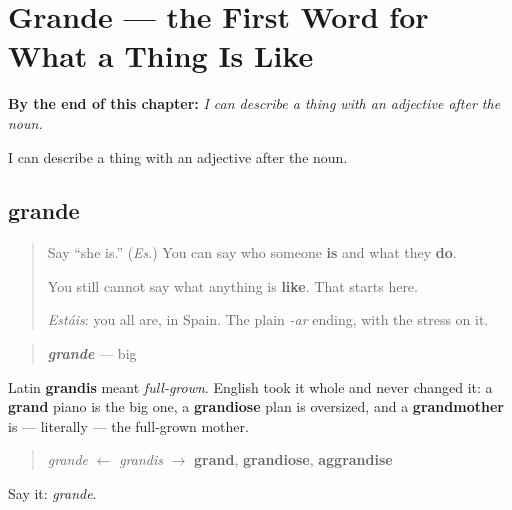 
\chapter{Grande --- the First Word for What a Thing Is Like}
\label{ch:grande}

\begin{chapteropening}
\textbf{By the end of this chapter:} \emph{I can describe a thing with an adjective after the noun.}

I can describe a thing with an adjective after the noun.
\end{chapteropening}

\section[grande]{grande}

\label{lesson:ES-C09-grande}



\begin{quote}
Say \textquotedblleft{}she is.\textquotedblright{} (\emph{Es}.) You can say who someone \textbf{is} and what they \textbf{do}.

You still cannot say what anything is \textbf{like}. That starts here.

\emph{Estáis}: you all are, in Spain. The plain \emph{-ar} ending, with the stress on it.
\end{quote}

\begin{cousinweb}
\begin{quote}
\emph{\textbf{grande}} — big
\end{quote}

Latin \textbf{grandis} meant \emph{full-grown}. English took it whole and never changed it: a \textbf{grand} piano is the big one, a \textbf{grandiose} plan is oversized, and a \textbf{grandmother} is — literally — the full-grown mother.

\begin{quote}
\emph{grande} $\leftarrow$ \emph{grandis} $\to$ \textbf{grand}, \textbf{grandiose}, \textbf{aggrandise}
\end{quote}

Say it: \emph{grande}.
\end{cousinweb}

